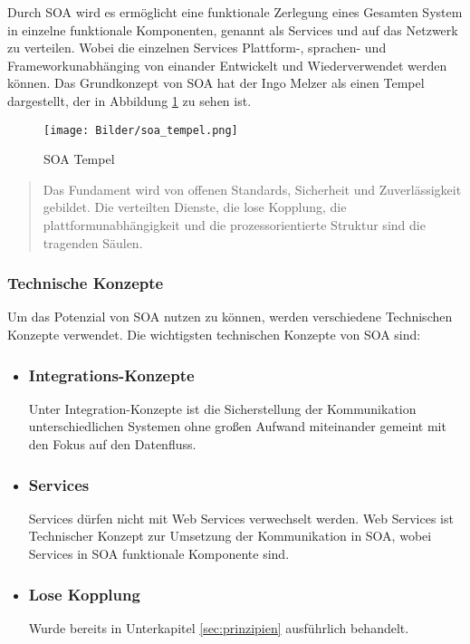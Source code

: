 Durch SOA wird es ermöglicht eine funktionale Zerlegung eines Gesamten System in einzelne funktionale Komponenten, genannt als Services und auf das Netzwerk zu verteilen. 
Wobei die einzelnen Services Plattform-, sprachen- und Frameworkunabhänging von einander Entwickelt und Wiederverwendet werden können. Das Grundkonzept von SOA hat der Ingo Melzer als einen Tempel dargestellt, der in Abbildung \ref{fig:soatempel} zu sehen ist.
\begin{figure}[H]
\centering
\texttt{[image: Bilder/soa\_tempel.png]}
\caption{SOA Tempel\label{fig:soatempel}}
\end{figure}
\begin{quote}
Das Fundament wird von offenen Standards, Sicherheit und Zuverlässigkeit gebildet. Die verteilten Dienste, die lose Kopplung, die plattformunabhängigkeit und die prozessorientierte Struktur sind die tragenden Säulen.
\end{quote}

\subsubsection{Technische Konzepte}
Um das Potenzial von SOA nutzen zu können, werden verschiedene Technischen Konzepte verwendet. Die wichtigsten technischen Konzepte von SOA sind: 

\begin{itemize}
\item \subsubsection*{Integrations-Konzepte} Unter Integration-Konzepte ist die Sicherstellung der Kommunikation unterschiedlichen Systemen ohne großen Aufwand miteinander gemeint mit den Fokus auf den Datenfluss.
\item \subsubsection*{Services} Services dürfen nicht mit Web Services verwechselt werden. Web Services ist Technischer Konzept zur Umsetzung der Kommunikation in SOA, wobei Services in SOA funktionale Komponente sind.
\item \subsubsection*{Lose Kopplung} Wurde bereits in Unterkapitel \ref{sec:prinzipien} ausführlich behandelt.
\end{itemize}

